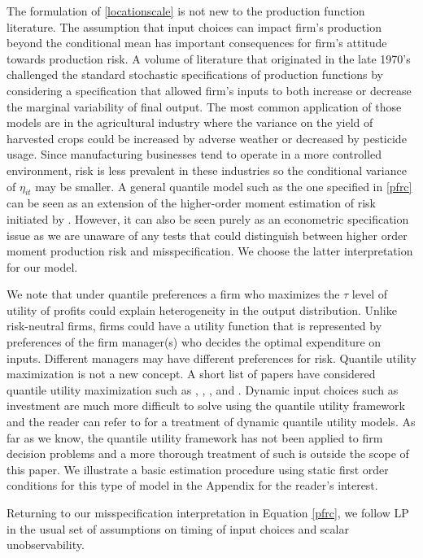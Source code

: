 \documentclass[11pt]{article}
\begin{document}
The formulation of \eqref{locationscale} is not new to the production function literature. The assumption that input choices can impact firm's production beyond the conditional mean has important consequences for firm's attitude towards production risk. A volume of literature that originated in the late 1970's challenged the standard stochastic specifications of production functions \citep{Just1978,Just1979} by considering a specification that allowed firm's inputs to both increase or decrease the marginal variability of final output. The most common application of those models are in the agricultural industry where the variance on the yield of harvested crops could be increased by adverse weather or decreased by pesticide usage. Since manufacturing businesses tend to operate in a more controlled environment, risk is less prevalent in these industries so the conditional variance of $\eta_{it}$ may be smaller. A general quantile model such as the one specified in \eqref{pfrc} can be seen as an extension of the higher-order moment estimation of risk initiated by \cite{Antle1983}. However, it can also be seen purely as an econometric specification issue as we are unaware of any tests that could distinguish between higher order moment production risk and misspecification. We choose the latter interpretation for our model. 

We note that under quantile preferences a firm who maximizes the $\tau$ level of utility of profits could explain heterogeneity in the output distribution. Unlike risk-neutral firms, firms could have a utility function that is represented by preferences of the firm manager(s) who decides the optimal expenditure on inputs. Different managers may have different preferences for risk. Quantile utility maximization is not a new concept. A short list of papers have considered quantile utility maximization such as \cite{Manski1988}, \cite{ROSTEK2009}, \cite{Chambers2007}, and \cite{Bhattacharya2009}. Dynamic input choices such as investment are much more difficult to solve using the quantile utility framework and the reader can refer to \cite{Castro2017} for a treatment of dynamic quantile utility models. As far as we know, the quantile utility framework has not been applied to firm decision problems and a more thorough treatment of such is outside the scope of this paper. We illustrate a basic estimation procedure using static first order conditions for this type of model in the Appendix for the reader's interest.

Returning to our misspecification interpretation in Equation \eqref{pfrc}, we follow LP in the usual set of assumptions on timing of input choices and scalar unobservability.
\end{document}
